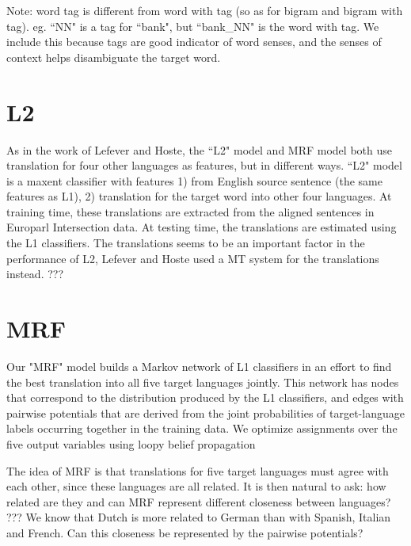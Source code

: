 \documentclass[11pt,letterpaper]{article}
\begin{document}
Note: word tag is different from word with tag (so as for bigram and bigram with tag). eg. ``NN" is a tag for ``bank", but ``bank_NN" is the word with tag. We include this because tags are good indicator of word senses, and the senses of context helps disambiguate the target word. 

\section{L2}
As in the work of Lefever and Hoste, the ``L2" model and MRF model both use translation for four other languages as features, but in different ways.
``L2" model is a maxent classifier with features 1) from English source sentence (the same features as L1), 2) translation for the target word into other four languages. 
At training time, these translations are extracted from the aligned sentences in Europarl Intersection data. 
At testing time, the translations are estimated using the L1 classifiers. 
The translations seems to be an important factor in the performance of L2, Lefever and Hoste used a MT system for the translations instead.
???



\section{MRF}
Our "MRF" model builds a Markov network of L1 classifiers in an effort to find
the best translation into all five target languages jointly. This network has
nodes that correspond to the distribution produced by the L1 classifiers, and
edges with pairwise potentials that are derived from the joint probabilities of
target-language labels occurring together in the training data. We optimize
assignments over the five output variables using loopy belief propagation

The idea of MRF is that translations for five target languages must agree with each other, since these languages are all related.
It is then natural to ask: how related are they and can MRF represent different closeness between languages?
???
We know that Dutch is more related to German than with Spanish, Italian and French. Can this closeness be represented by the pairwise potentials?
\end{document}
